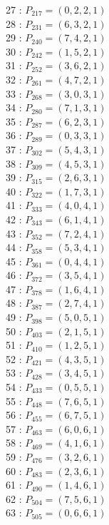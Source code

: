 \documentclass{article}
\begin{document}
{\begin{multicols}{3}
27 : $P_{217}=( 0, 2, 2, 1 )$\\
28 : $P_{231}=( 6, 3, 2, 1 )$\\
29 : $P_{240}=( 7, 4, 2, 1 )$\\
30 : $P_{242}=( 1, 5, 2, 1 )$\\
31 : $P_{252}=( 3, 6, 2, 1 )$\\
32 : $P_{261}=( 4, 7, 2, 1 )$\\
33 : $P_{268}=( 3, 0, 3, 1 )$\\
34 : $P_{280}=( 7, 1, 3, 1 )$\\
35 : $P_{287}=( 6, 2, 3, 1 )$\\
36 : $P_{289}=( 0, 3, 3, 1 )$\\
37 : $P_{302}=( 5, 4, 3, 1 )$\\
38 : $P_{309}=( 4, 5, 3, 1 )$\\
39 : $P_{315}=( 2, 6, 3, 1 )$\\
40 : $P_{322}=( 1, 7, 3, 1 )$\\
41 : $P_{333}=( 4, 0, 4, 1 )$\\
42 : $P_{343}=( 6, 1, 4, 1 )$\\
43 : $P_{352}=( 7, 2, 4, 1 )$\\
44 : $P_{358}=( 5, 3, 4, 1 )$\\
45 : $P_{361}=( 0, 4, 4, 1 )$\\
46 : $P_{372}=( 3, 5, 4, 1 )$\\
47 : $P_{378}=( 1, 6, 4, 1 )$\\
48 : $P_{387}=( 2, 7, 4, 1 )$\\
49 : $P_{398}=( 5, 0, 5, 1 )$\\
50 : $P_{403}=( 2, 1, 5, 1 )$\\
51 : $P_{410}=( 1, 2, 5, 1 )$\\
52 : $P_{421}=( 4, 3, 5, 1 )$\\
53 : $P_{428}=( 3, 4, 5, 1 )$\\
54 : $P_{433}=( 0, 5, 5, 1 )$\\
55 : $P_{448}=( 7, 6, 5, 1 )$\\
56 : $P_{455}=( 6, 7, 5, 1 )$\\
57 : $P_{463}=( 6, 0, 6, 1 )$\\
58 : $P_{469}=( 4, 1, 6, 1 )$\\
59 : $P_{476}=( 3, 2, 6, 1 )$\\
60 : $P_{483}=( 2, 3, 6, 1 )$\\
61 : $P_{490}=( 1, 4, 6, 1 )$\\
62 : $P_{504}=( 7, 5, 6, 1 )$\\
63 : $P_{505}=( 0, 6, 6, 1 )$\\

\end{multicols}}
\end{document}
